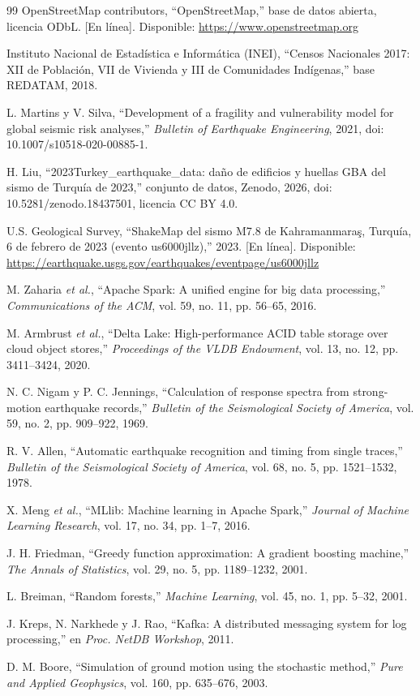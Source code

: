 \documentclass[conference]{IEEEtran}%
\begin{document}
\begin{thebibliography}{99}
OpenStreetMap contributors, ``OpenStreetMap,'' base de datos abierta, licencia ODbL. [En línea]. Disponible: \url{https://www.openstreetmap.org}

Instituto Nacional de Estadística e Informática (INEI), ``Censos Nacionales 2017: XII de Población, VII de Vivienda y III de Comunidades Indígenas,'' base REDATAM, 2018.

L. Martins y V. Silva, ``Development of a fragility and vulnerability model for global seismic risk analyses,'' \emph{Bulletin of Earthquake Engineering}, 2021, doi: 10.1007/s10518-020-00885-1.

H. Liu, ``2023Turkey\_earthquake\_data: daño de edificios y huellas GBA del sismo de Turquía de 2023,'' conjunto de datos, Zenodo, 2026, doi: 10.5281/zenodo.18437501, licencia CC BY 4.0.

U.S. Geological Survey, ``ShakeMap del sismo M7.8 de Kahramanmara\c{s}, Turquía, 6 de febrero de 2023 (evento us6000jllz),'' 2023. [En línea]. Disponible: \url{https://earthquake.usgs.gov/earthquakes/eventpage/us6000jllz}

M. Zaharia \emph{et al.}, ``Apache Spark: A unified engine for big data processing,'' \emph{Communications of the ACM}, vol. 59, no. 11, pp. 56--65, 2016.

M. Armbrust \emph{et al.}, ``Delta Lake: High-performance ACID table storage over cloud object stores,'' \emph{Proceedings of the VLDB Endowment}, vol. 13, no. 12, pp. 3411--3424, 2020.

N. C. Nigam y P. C. Jennings, ``Calculation of response spectra from strong-motion earthquake records,'' \emph{Bulletin of the Seismological Society of America}, vol. 59, no. 2, pp. 909--922, 1969.

R. V. Allen, ``Automatic earthquake recognition and timing from single traces,'' \emph{Bulletin of the Seismological Society of America}, vol. 68, no. 5, pp. 1521--1532, 1978.

X. Meng \emph{et al.}, ``MLlib: Machine learning in Apache Spark,'' \emph{Journal of Machine Learning Research}, vol. 17, no. 34, pp. 1--7, 2016.

J. H. Friedman, ``Greedy function approximation: A gradient boosting machine,'' \emph{The Annals of Statistics}, vol. 29, no. 5, pp. 1189--1232, 2001.

L. Breiman, ``Random forests,'' \emph{Machine Learning}, vol. 45, no. 1, pp. 5--32, 2001.

J. Kreps, N. Narkhede y J. Rao, ``Kafka: A distributed messaging system for log processing,'' en \emph{Proc. NetDB Workshop}, 2011.

D. M. Boore, ``Simulation of ground motion using the stochastic method,'' \emph{Pure and Applied Geophysics}, vol. 160, pp. 635--676, 2003.

\end{thebibliography}
\end{document}
